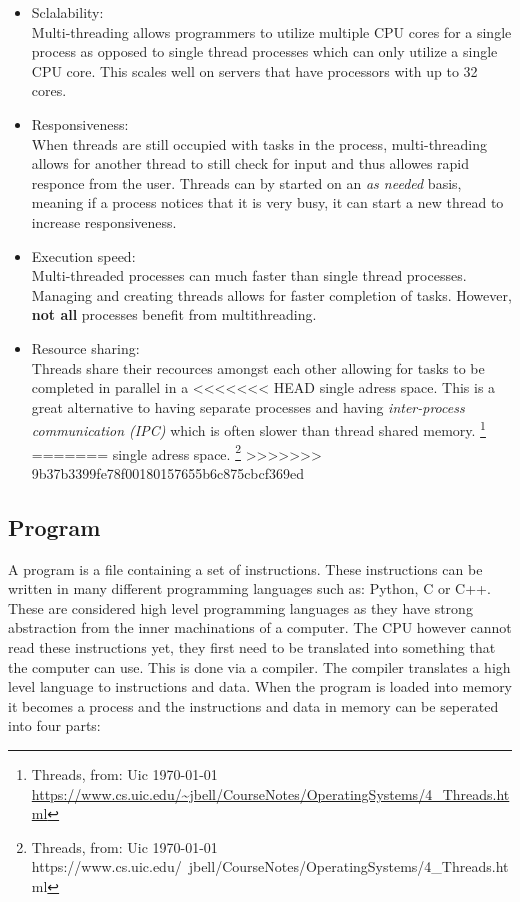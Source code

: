 \begin{itemize}
\item Sclalability: \\

Multi-threading allows programmers to utilize multiple CPU cores for a single process as opposed to single
thread processes which can only utilize a single CPU core. This scales well on servers that have processors
with up to 32 cores.

\item Responsiveness: \\

When threads are still occupied with tasks in the process, multi-threading allows for another thread
to still check for input and thus allowes rapid responce from the user. Threads can by started on an
		\textit{as needed} basis, meaning if a process notices that it is very busy, it can start
		a new thread to increase responsiveness.

\item Execution speed: \\

Multi-threaded processes can much faster than single thread processes. Managing and creating threads allows for
		faster completion of tasks. However, \textbf{not all} processes benefit from multithreading. 

\item Resource sharing: \\

Threads share their recources amongst each other allowing for tasks to be completed in parallel in a
<<<<<<< HEAD
		single adress space. This is a great alternative to having separate processes and having \textit{inter-process communication (IPC)}
		which is often slower than thread shared memory.
		\footnote{Threads, from: Uic \today \\ \url{https://www.cs.uic.edu/~jbell/CourseNotes/OperatingSystems/4_Threads.html} }
=======
single adress space. \footnote{Threads, from: Uic \today \\ https://www.cs.uic.edu/~jbell/CourseNotes/OperatingSystems/4\_Threads.html }
>>>>>>> 9b37b3399fe78f00180157655b6c875cbcf369ed

\end{itemize}

\subsection{Program}

A program is a file containing a set of instructions. These instructions can be written in many different 
programming languages such as: Python, C or C++. These are considered high level programming languages as 
they have strong abstraction from the inner machinations of a computer. The CPU however cannot read these 
instructions yet, they first need to be translated into something that the computer can use. This is done 
via a compiler. The compiler translates a high level language to instructions and data. When the program is
loaded into memory it becomes a process and the instructions and data in memory can be seperated into four parts:

